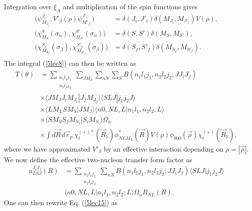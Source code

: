 \begin{subappendices}
Integration over $\xi_A$ and multiplication of the spin functions gives
\begin{equation}\label{5lec14}
\begin{split}
\bigl( \psi_{M_{J_i}}^{J_i},V'_\beta(\rho) \psi_{M'_{J_i}}^{J'_i}\bigr)&= \delta(J_i,J'_i)
\delta(M_{J_i},M_{J'_i})V(\rho),\\
\bigl( \chi_{M_S}^{S}(\sigma_\alpha),\chi_{M_{S'}}^{S'}(\sigma_\alpha)\bigr)&= \delta(S,S')
\delta(M_S,M_{S'}),\\
\bigl( \chi_{M_{S_f}}^{S_f}(\sigma_\beta),\chi_{M_{S'_f}}^{S'_f}(\sigma_\beta)\bigr)&= \delta(S_f,S'_f)
\delta(M_{S_f},M_{S'_f}).\\
\end{split}
\end{equation}
The integral (\ref{5lec8}) can then be written as
\begin{equation}\label{5lec15}
\begin{split}
T(\theta)&= \sum_{\substack{n_1 l_1 j_1\\n_2 l_2 j_2}}\sum_{J M_J}\sum_{nN}\sum_{S}B(n_1 l_1 j_1,n_2 l_2 j_2;JJ_i J_f)\\
&\times \langle J M_J J_i M_{J_i}|J_f M_{J_f} \rangle \langle SLJ|j_1 j_2 J \rangle \\
&\times \langle L M_L S M_{S}|J M_{J} \rangle \langle n0,NL,L|n_1 l_1,n_2 l_2,L \rangle \\
&\times \langle S M_S S_f M_{S_f}|S_i M_{S_i}\rangle \Omega_n \\
&\times \int d\vec R\,d\vec r_p\, \chi^{(+)*}_t(\vec R_1) \phi^*_{NLM_L}(\vec R) V(\rho) \phi_{000}(\vec \rho) \chi^{(+)}_t(\vec R_1),
\end{split}
\end{equation}
where we have approximated $V'_\beta$ by an effective interaction depending on $\rho=|\vec \rho|$.
We now define the effective two-nucleon transfer  form factor as
\begin{equation}\label{eqC7B15}
\begin{split}
u^{J_i J_f}_{LSJ}(R)&=\sum_{\substack{n_1 l_1 j_1\\n_2 l_2 j_2}}\sum_{nN} B(n_1 l_1 j_1,n_2 l_2 j_2;JJ_i J_f) \langle S L J|j_1 j_2 J\rangle\\
&\langle n0,NL,L|n_1 l_1,n_2 l_2;L \rangle \Omega_n R_{NL}(R).
\end{split}
\end{equation}
One can then rewrite Eq. (\ref{5lec15}) as
\begin{equation}\label{5lec17}
\begin{split}

\end{split}
\end{equation}
\end{subappendices}
